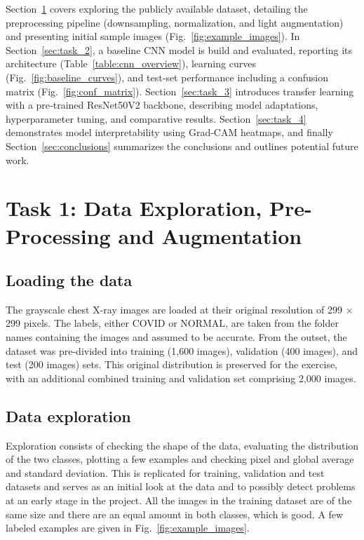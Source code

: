 \documentclass[conference]{IEEEtran}
\begin{document}
Section~\ref{sec:task_1} covers exploring the publicly available dataset, detailing the preprocessing pipeline (downsampling, normalization, and light augmentation) and presenting initial sample images (Fig.~\ref{fig:example_images}). In Section~\ref{sec:task_2}, a baseline CNN model is build and evaluated, reporting its architecture (Table~\ref{table:cnn_overview}), learning curves (Fig.~\ref{fig:baseline_curves}), and test‑set performance including a confusion matrix (Fig.~\ref{fig:conf_matrix}). Section~\ref{sec:task_3} introduces transfer learning with a pre‑trained ResNet50V2 backbone, describing model adaptations, hyperparameter tuning, and comparative results. Section~\ref{sec:task_4} demonstrates model interpretability using Grad‑CAM heatmaps, and finally Section~\ref{sec:conclusions} summarizes the conclusions and outlines potential future work.

\section{Task 1: Data Exploration, Pre-Processing and Augmentation}\label{sec:task_1}

\subsection{Loading the data}
The grayscale chest X-ray images are loaded at their original resolution of 299 × 299 pixels. The labels, either COVID or NORMAL, are taken from the folder names containing the images and assumed to be accurate. From the outset, the dataset was pre-divided into training (1,600 images), validation (400 images), and test (200 images) sets. This original distribution is preserved for the exercise, with an additional combined training and validation set comprising 2,000 images.

\subsection{Data exploration}
Exploration consists of checking the shape of the data, evaluating the distribution of the two classes, plotting a few examples and checking pixel and global average and standard deviation. This is replicated for training, validation and test datasets and serves as an initial look at the data and to possibly detect problems at an early stage in the project.
All the images in the training dataset are of the same size and there are an equal amount in both classes, which is good. A few labeled examples are given in Fig.~\ref{fig:example_images}.
\end{document}
